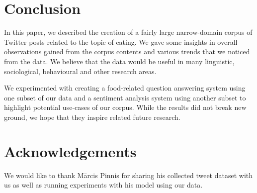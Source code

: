 \documentclass{IOS-Book-Article}
\begin{document}
\section{Conclusion} 
\label{sec:conclusion}
In this paper, we described the creation of a fairly large narrow-domain corpus of Twitter posts related to the topic of eating. We gave some insights in overall observations gained from the corpus contents and various trends that we noticed from the data. We believe that the data would be useful in many linguistic, sociological, behavioural and other research areas.

We experimented with creating a food-related question answering system using one subset of our data and a sentiment analysis system using another subset to highlight potential use-cases of our corpus. While the results did not break new ground, we hope that they inspire related future research.



\section*{Acknowledgements}
\label{sec:acknowledgments}

We would like to thank Mārcis Pinnis for sharing his collected tweet dataset with us as well as running experiments with his model using our data.



\end{document}

